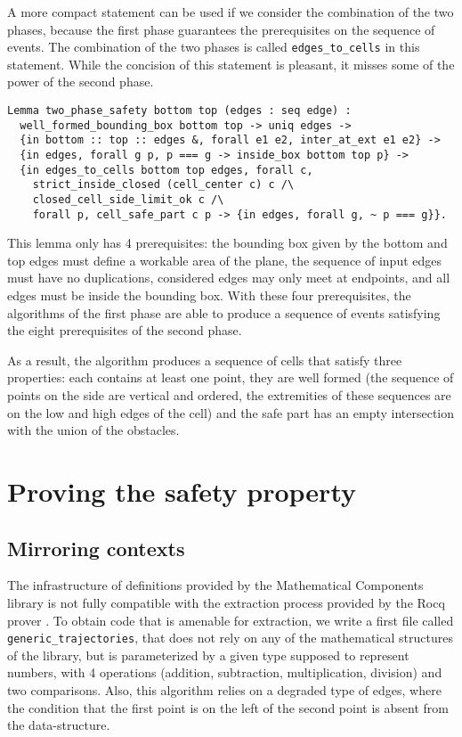 \documentclass[a4paper, USenglish, cleveref, autoref, thm-restate, final]{lipics-v2021}
\begin{document}
A more compact statement can be used if we consider the combination of the
two phases, because the first phase guarantees the prerequisites on the
sequence of events.  The combination of the two phases is called
{\tt edges\_to\_cells} in this statement.
While the concision of this statement is pleasant, it
misses some of the power of the second phase.
\begin{verbatim}
Lemma two_phase_safety bottom top (edges : seq edge) :
  well_formed_bounding_box bottom top -> uniq edges ->
  {in bottom :: top :: edges &, forall e1 e2, inter_at_ext e1 e2} ->
  {in edges, forall g p, p === g -> inside_box bottom top p} ->
  {in edges_to_cells bottom top edges, forall c,
    strict_inside_closed (cell_center c) c /\
    closed_cell_side_limit_ok c /\
    forall p, cell_safe_part c p -> {in edges, forall g, ~ p === g}}.
\end{verbatim}
This lemma only has 4 prerequisites: the bounding box given by the
bottom and top edges must define a workable area of the plane, the sequence
of input edges must have no duplications, considered edges may only
meet at endpoints, and all edges must be inside the bounding box.  With these
four prerequisites, the algorithms of the first phase are able to produce
a sequence of events satisfying the eight prerequisites of the second phase.

As a result, the algorithm produces a sequence of cells that satisfy three
properties: each contains at least one point, they are well formed (the 
sequence of points on the side are vertical and ordered, the extremities of
these sequences are on the low and high edges of the cell) and the safe
part has an empty intersection with the union of the obstacles.

\section{Proving the safety property}
\subsection{Mirroring contexts}
The infrastructure of definitions provided by the {\sc Mathematical
Components} library is not fully compatible with the extraction
process provided by the Rocq prover \cite{letouzey:hal-00150914}.
To obtain code that is amenable for extraction, we write a
first file called {\tt generic\_trajectories}, that does not rely on
any of the mathematical structures of the library, but is
parameterized by a given type supposed to represent numbers, with 4
operations (addition, subtraction, multiplication, division) and two
comparisons.  Also, this algorithm relies on a degraded type of edges,
where the condition that the first point is on the left of the second
point is absent from the data-structure.
\end{document}
